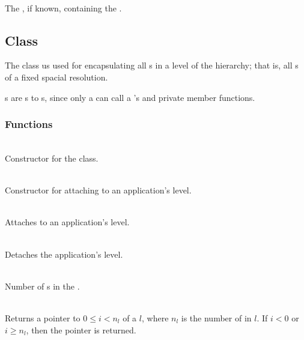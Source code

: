 \documentclass[11pt]{article}
\begin{document}
     \\ The , if
     known, containing the .

\subsection{ Class} \label{ss:level}

   The  class us used for encapsulating all s
   in a level of the hierarchy; that is, all s of a fixed
   spacial resolution.

   \umlLevel

   s are s to s, since only
   a  can call a 's  and
    private member functions.

\subsubsection{ Functions}


     \\
    Constructor for the  class.

     \\
    Constructor for attaching to an application's level.

     \\
    Attaches to an application's level.

     \\
    Detaches the application's level.

     \\
    Number of s in the .

     \\ Returns 
    a pointer to  $0 \le i < n_l$ of a  $l$, where
    $n_l$ is the number of  in $l$.  If $i <0 $ or $i \ge
    n_l$, then the  pointer is returned.
\end{document}
